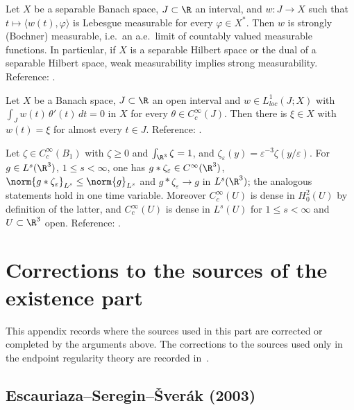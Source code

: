\documentclass[11pt,reqno]{amsart}
\begin{document}
\begin{externalinput}\label{ext:pettis}
Let $X$ be a separable Banach space, $J\subset\R$ an interval, and
$w:J\to X$ such that $t\mapsto\langle w(t),\varphi\rangle$ is Lebesgue
measurable for every $\varphi\in X^{*}$. Then $w$ is strongly (Bochner)
measurable, i.e.\ an a.e.\ limit of countably valued measurable functions.
In particular, if $X$ is a separable
Hilbert space or the dual of a separable Hilbert space, weak measurability
implies strong measurability.
Reference: \cite[Ch.~II]{DiestelUhl1977}.
\end{externalinput}

\begin{externalinput}\label{ext:dubois-reymond}
Let $X$ be a Banach space, $J\subset\R$ an open interval and
$w\in L^{1}_{loc}(J;X)$ with
$\int_{J}w(t)\,\theta'(t)\,dt=0$ in $X$ for every $\theta\in C_{c}^{\infty}(J)$.
Then there is $\xi\in X$ with $w(t)=\xi$ for almost every $t\in J$.
Reference: \cite[Ch.~III, Lemma 1.1]{Temam1977}.
\end{externalinput}

\begin{externalinput}\label{ext:mollify}
Let $\zeta\in C_{c}^{\infty}(B_{1})$ with $\zeta\ge0$ and
$\int_{\R^{3}}\zeta=1$, and $\zeta_{\varepsilon}(y)=\varepsilon^{-3}\zeta(y/\varepsilon)$.
For $g\in L^{s}(\R^{3})$, $1\le s<\infty$, one has
$g*\zeta_{\varepsilon}\in C^{\infty}(\R^{3})$,
$\norm{g*\zeta_{\varepsilon}}_{L^{s}}\le\norm{g}_{L^{s}}$ and
$g*\zeta_{\varepsilon}\to g$ in $L^{s}(\R^{3})$; the analogous statements hold in
one time variable. Moreover $C_{c}^{\infty}(U)$ is dense in $H^{2}_{0}(U)$ by
definition of the latter, and $C_{c}^{\infty}(U)$ is dense in $L^{s}(U)$ for
$1\le s<\infty$ and $U\subset\R^{3}$ open.
Reference: \cite[Ch.~7]{GilbargTrudinger2001}.
\end{externalinput}

\section{Corrections to the sources of the existence part}\label{app:errata}

This appendix records where the sources used in this part are corrected or
completed by the arguments above. The corrections to the sources used only in
the endpoint regularity theory are recorded in~\cite{ESSLean}.

\subsection*{Escauriaza--Seregin--\v{S}ver\'ak (2003)}
\end{document}
